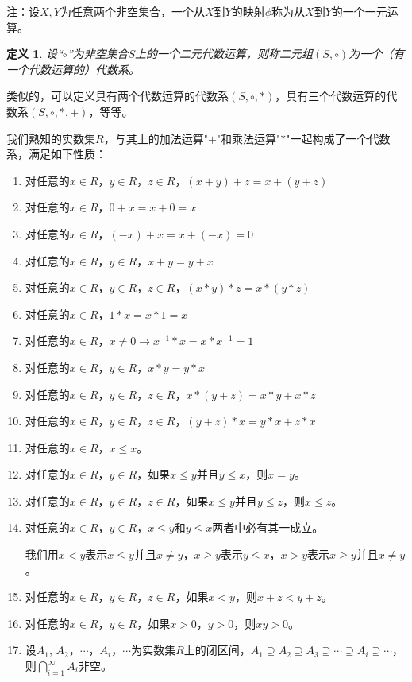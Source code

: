 \documentclass{article}
\newtheorem{Def}{定义}
\begin{document}
\begin{CJK*}{UTF8}{gbsn}
注：设$X,Y$为任意两个非空集合，一个从$X$到$Y$的映射$\phi$称为从$X$到$Y$的一个一元运算。

\begin{Def}
  设“$\circ$”为非空集合$S$上的一个二元代数运算，则称二元组$(S,\circ)$为一个（有一个代数运算的）代数系。
\end{Def}
类似的，可以定义具有两个代数运算的代数系$(S,\circ,*)$，具有三个代数运算的代数系$(S,\circ,*,+)$，等等。

我们熟知的实数集$R$，与其上的加法运算"$+$"和乘法运算"$*$"一起构成了一个代数系，满足如下性质：
   \begin{enumerate} 
   \item   对任意的$x\in R$，$y\in R$，$z\in R$，$(x + y) + z = x + (y + z)$
   \item   对任意的$x\in R$，$0 + x = x + 0 = x$
   \item   对任意的$x\in R$，$(-x) + x =x + (-x) = 0$
   \item   对任意的$x\in R$，$y\in R$，$x + y = y + x$ 
   \item   对任意的$x\in R$，$y\in R$，$z\in R$，$(x * y) * z = x * (y *z)$
   \item   对任意的$x\in R$，$1 * x = x * 1 = x$
   \item   对任意的$x\in R$，$x\neq 0 \to x^{-1} * x = x * x^{-1} = 1$
   \item   对任意的$x\in R$，$y\in R$，$x * y = y * x$
   \item   对任意的$x\in R$，$y\in R$，$z\in R$，$x* (y + z) = x * y + x * z$
   \item   对任意的$x\in R$，$y\in R$，$z\in R$，$(y + z) * x = y * x + z * x$
   \item 对任意的$x\in R$，$x\leq x$。
   \item 对任意的$x\in R$，$y\in R$，如果$x\leq y$并且$y\leq x$，则$x=y$。 
  \item 对任意的$x\in R$，$y\in R$，$z\in R$，如果$x\leq y$并且$y\leq z$，则$x\leq z$。
  \item 对任意的$x\in R$，$y\in R$，$x\leq y$和$y\leq x$两者中必有其一成立。
  
  我们用$x<y$表示$x\leq y$并且$x\neq y$，$x\geq y$表示$y\leq x$，$x > y$表示$x\geq y$并且$x\neq y$。
  
  \item 对任意的$x\in R$，$y\in R$，$z\in R$，如果$x<y$，则$x+z<y+z$。
  \item 对任意的$x\in R$，$y\in R$，如果$x>0$，$y>0$，则$xy>0$。
  \item 设$A_1$, $A_2$，$\cdots$，$A_i$，$\cdots$为实数集$R$上的闭区间，$A_1\supseteq A_2 \supseteq A_3 \supseteq \cdots \supseteq A_i \supseteq \cdots$，则$\bigcap_{i=1}^{\infty}A_i$非空。
  \end{enumerate}



\end{CJK*}
\end{document}

